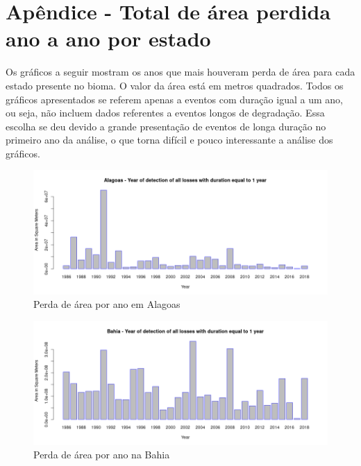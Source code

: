 \appendix 
\section{Apêndice - Total de área perdida ano a ano por estado}

\hspace{13pt} Os gráficos a seguir mostram os anos que mais houveram perda de área para cada estado presente no bioma. O valor da área está em metros quadrados. Todos os gráficos apresentados se referem apenas a eventos com duração igual a um ano, ou seja, não incluem dados referentes a eventos longos de degradação. Essa escolha se deu devido a grande presentação de eventos de longa duração no primeiro ano da análise, o que torna difícil e pouco interessante a análise dos gráficos.

\begin{figure}[H]
    \centering
    \includegraphics[scale=.5]{images/loss_graphics/Alagoas_loss_eq1.png}
    \caption{Perda de área por ano em Alagoas}
    \label{fig:loss_alagoas}
\end{figure}

\begin{figure}[H]
    \centering
    \includegraphics[scale=.5]{images/loss_graphics/Bahia_loss_eq1.png}
    \caption{Perda de área por ano na Bahia}
    \label{fig:loss_bahia}
\end{figure}

